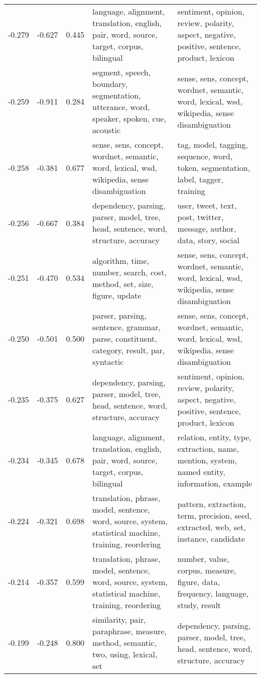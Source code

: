 \begin{tabular}{cccp{5cm}p{5cm}}
-0.279 & -0.627 & 0.445 & language, alignment, translation, english, pair, word, source, target, corpus, bilingual & sentiment, opinion, review, polarity, aspect, negative, positive, sentence, product, lexicon \\
-0.259 & -0.911 & 0.284 & segment, speech, boundary, segmentation, utterance, word, speaker, spoken, cue, acoustic & sense, sens, concept, wordnet, semantic, word, lexical, wsd, wikipedia, sense disambiguation \\
-0.258 & -0.381 & 0.677 & sense, sens, concept, wordnet, semantic, word, lexical, wsd, wikipedia, sense disambiguation & tag, model, tagging, sequence, word, token, segmentation, label, tagger, training \\
-0.256 & -0.667 & 0.384 & dependency, parsing, parser, model, tree, head, sentence, word, structure, accuracy & user, tweet, text, post, twitter, message, author, data, story, social \\
-0.251 & -0.470 & 0.534 & algorithm, time, number, search, cost, method, set, size, figure, update & sense, sens, concept, wordnet, semantic, word, lexical, wsd, wikipedia, sense disambiguation \\
-0.250 & -0.501 & 0.500 & parser, parsing, sentence, grammar, parse, constituent, category, result, par, syntactic & sense, sens, concept, wordnet, semantic, word, lexical, wsd, wikipedia, sense disambiguation \\
-0.235 & -0.375 & 0.627 & dependency, parsing, parser, model, tree, head, sentence, word, structure, accuracy & sentiment, opinion, review, polarity, aspect, negative, positive, sentence, product, lexicon \\
-0.234 & -0.345 & 0.678 & language, alignment, translation, english, pair, word, source, target, corpus, bilingual & relation, entity, type, extraction, name, mention, system, named entity, information, example \\
-0.224 & -0.321 & 0.698 & translation, phrase, model, sentence, word, source, system, statistical machine, training, reordering & pattern, extraction, term, precision, seed, extracted, web, set, instance, candidate \\
-0.214 & -0.357 & 0.599 & translation, phrase, model, sentence, word, source, system, statistical machine, training, reordering & number, value, corpus, measure, figure, data, frequency, language, study, result \\
-0.199 & -0.248 & 0.800 & similarity, pair, paraphrase, measure, method, semantic, two, using, lexical, set & dependency, parsing, parser, model, tree, head, sentence, word, structure, accuracy \\

\end{tabular}
